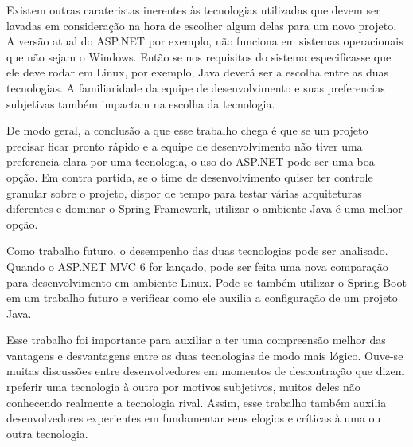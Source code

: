 \documentclass[a4paper,12pt]{article}
\begin{document}
Existem outras carateristas inerentes às tecnologias utilizadas que devem ser lavadas em consideração na hora de escolher algum delas para um novo projeto. A versão atual do ASP.NET por exemplo, não funciona em sistemas operacionais que não sejam o Windows. Então se nos requisitos do sistema especificasse que ele deve rodar em Linux, por exemplo, Java deverá ser a escolha entre as duas tecnologias. A familiaridade da equipe de desenvolvimento e suas preferencias subjetivas também impactam na escolha da tecnologia.

De modo geral, a conclusão a que esse trabalho chega é que se um projeto precisar ficar pronto rápido e a equipe de desenvolvimento não tiver uma preferencia clara por uma tecnologia, o uso do ASP.NET pode ser uma boa opção. Em contra partida, se o time de desenvolvimento quiser ter controle granular sobre o projeto, dispor de tempo para testar várias arquiteturas diferentes e dominar o Spring Framework, utilizar o ambiente Java é uma melhor opção.

Como trabalho futuro, o desempenho das duas tecnologias pode ser analisado. Quando o ASP.NET MVC 6 for lançado, pode ser feita uma nova comparação para desenvolvimento em ambiente Linux. Pode-se também utilizar o Spring Boot em um trabalho futuro e verificar como ele auxilia a configuração de um projeto Java.

Esse trabalho foi importante para auxiliar a ter uma compreensão melhor das vantagens e desvantagens entre as duas tecnologias de modo mais lógico. Ouve-se muitas discussões entre desenvolvedores em momentos de descontração que dizem rpeferir uma tecnologia à outra por motivos subjetivos, muitos deles não conhecendo realmente a tecnologia rival. Assim, esse trabalho também auxilia desenvolvedores experientes em fundamentar seus elogios e críticas à uma ou outra tecnologia.
\end{document}
